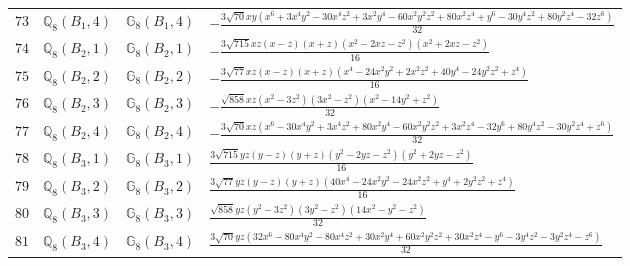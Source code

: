 \documentclass[fleqn,8pt,landscape]{jsarticle}
\begin{document}
\begin{table}[ht!]
\begin{center}
\begin{tabular}{cccl}
$ 73 $ & $ \mathbb{Q}_{8}(B_{1},4) $ & $ \mathbb{G}_{8}(B_{1},4) $ & $ - \frac{3 \sqrt{70} x y \left(x^{6} + 3 x^{4} y^{2} - 30 x^{4} z^{2} + 3 x^{2} y^{4} - 60 x^{2} y^{2} z^{2} + 80 x^{2} z^{4} + y^{6} - 30 y^{4} z^{2} + 80 y^{2} z^{4} - 32 z^{6}\right)}{32} $ \\
$ 74 $ & $ \mathbb{Q}_{8}(B_{2},1) $ & $ \mathbb{G}_{8}(B_{2},1) $ & $ - \frac{3 \sqrt{715} x z \left(x - z\right) \left(x + z\right) \left(x^{2} - 2 x z - z^{2}\right) \left(x^{2} + 2 x z - z^{2}\right)}{16} $ \\
$ 75 $ & $ \mathbb{Q}_{8}(B_{2},2) $ & $ \mathbb{G}_{8}(B_{2},2) $ & $ - \frac{3 \sqrt{77} x z \left(x - z\right) \left(x + z\right) \left(x^{4} - 24 x^{2} y^{2} + 2 x^{2} z^{2} + 40 y^{4} - 24 y^{2} z^{2} + z^{4}\right)}{16} $ \\
$ 76 $ & $ \mathbb{Q}_{8}(B_{2},3) $ & $ \mathbb{G}_{8}(B_{2},3) $ & $ - \frac{\sqrt{858} x z \left(x^{2} - 3 z^{2}\right) \left(3 x^{2} - z^{2}\right) \left(x^{2} - 14 y^{2} + z^{2}\right)}{32} $ \\
$ 77 $ & $ \mathbb{Q}_{8}(B_{2},4) $ & $ \mathbb{G}_{8}(B_{2},4) $ & $ - \frac{3 \sqrt{70} x z \left(x^{6} - 30 x^{4} y^{2} + 3 x^{4} z^{2} + 80 x^{2} y^{4} - 60 x^{2} y^{2} z^{2} + 3 x^{2} z^{4} - 32 y^{6} + 80 y^{4} z^{2} - 30 y^{2} z^{4} + z^{6}\right)}{32} $ \\
$ 78 $ & $ \mathbb{Q}_{8}(B_{3},1) $ & $ \mathbb{G}_{8}(B_{3},1) $ & $ \frac{3 \sqrt{715} y z \left(y - z\right) \left(y + z\right) \left(y^{2} - 2 y z - z^{2}\right) \left(y^{2} + 2 y z - z^{2}\right)}{16} $ \\
$ 79 $ & $ \mathbb{Q}_{8}(B_{3},2) $ & $ \mathbb{G}_{8}(B_{3},2) $ & $ \frac{3 \sqrt{77} y z \left(y - z\right) \left(y + z\right) \left(40 x^{4} - 24 x^{2} y^{2} - 24 x^{2} z^{2} + y^{4} + 2 y^{2} z^{2} + z^{4}\right)}{16} $ \\
$ 80 $ & $ \mathbb{Q}_{8}(B_{3},3) $ & $ \mathbb{G}_{8}(B_{3},3) $ & $ \frac{\sqrt{858} y z \left(y^{2} - 3 z^{2}\right) \left(3 y^{2} - z^{2}\right) \left(14 x^{2} - y^{2} - z^{2}\right)}{32} $ \\
$ 81 $ & $ \mathbb{Q}_{8}(B_{3},4) $ & $ \mathbb{G}_{8}(B_{3},4) $ & $ \frac{3 \sqrt{70} y z \left(32 x^{6} - 80 x^{4} y^{2} - 80 x^{4} z^{2} + 30 x^{2} y^{4} + 60 x^{2} y^{2} z^{2} + 30 x^{2} z^{4} - y^{6} - 3 y^{4} z^{2} - 3 y^{2} z^{4} - z^{6}\right)}{32} $ \\
 \hline \hline
\end{tabular}
\end{center}
\end{table}
\end{document}
